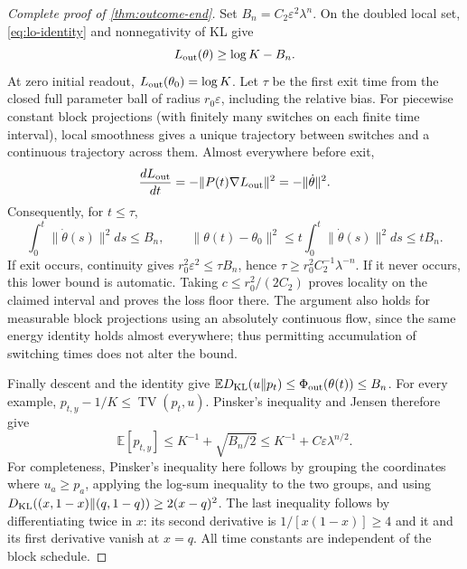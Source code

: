\begin{proof}[Complete proof of \cref{thm:outcome-end}]
Set $B_n=C_2\varepsilon^2\lambda^n$. On the doubled local set, \eqref{eq:lo-identity} and nonnegativity of KL give
\begin{equation}L_{\rm out}(\theta)\ge\log K-B_n.\label{eq:lo-floor}\end{equation}
At zero initial readout, $L_{\rm out}(\theta_0)=\log K$. Let $\tau$ be the first exit time from the closed full parameter ball of radius $r_0\varepsilon$, including the relative bias. For piecewise constant block projections (with finitely many switches on each finite time interval), local smoothness gives a unique trajectory between switches and a continuous trajectory across them. Almost everywhere before exit,
\[
 \frac{dL_{\rm out}}{dt}=-\|P(t)\nabla L_{\rm out}\|^2=-\|\dot\theta\|^2.
\]
Consequently, for $t\le\tau$,
\[
 \int_0^t\|\dot\theta(s)\|^2ds\le B_n,\qquad
 \|\theta(t)-\theta_0\|^2\le t\int_0^t\|\dot\theta(s)\|^2ds\le tB_n.
\]
If exit occurs, continuity gives $r_0^2\varepsilon^2\le\tau B_n$, hence $\tau\ge r_0^2 C_2^{-1}\lambda^{-n}$. If it never occurs, this lower bound is automatic. Taking $c\le r_0^2/(2C_2)$ proves locality on the claimed interval and proves the loss floor there. The argument also holds for measurable block projections using an absolutely continuous flow, since the same energy identity holds almost everywhere; thus permitting accumulation of switching times does not alter the bound.

Finally descent and the identity give $\mathbb E D_{\rm KL}(u\|p_t)\le\Phi_{\mathrm{out}}(\theta(t))\le B_n$. For every example, $p_{t,y}-1/K\le\operatorname{TV}(p_t,u)$. Pinsker's inequality and Jensen therefore give
\[
 \mathbb E[p_{t,y}]\le K^{-1}+\sqrt{B_n/2}
 \le K^{-1}+C\varepsilon\lambda^{n/2}.
\]
For completeness, Pinsker's inequality here follows by grouping the coordinates where $u_a\ge p_a$, applying the log-sum inequality to the two groups, and using $D_{\rm KL}((x,1-x)\|(q,1-q))\ge2(x-q)^2$. The last inequality follows by differentiating twice in $x$: its second derivative is $1/[x(1-x)]\ge4$ and it and its first derivative vanish at $x=q$. All time constants are independent of the block schedule.
\end{proof}
